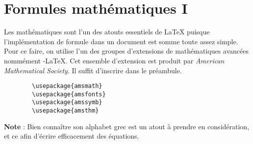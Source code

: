 	\section*{Formules mathématiques I}
	Les mathématiques sont l'un des atouts essentiels de \LaTeX{} puisque l'implémentation de formule dans un document est somme toute assez simple. Pour ce faire, on utilise l'un des groupes d'extensions de mathématiques avancées nommément \AmS-\LaTeX. Cet ensemble d'extension est produit par \emph{American Mathematical Society}. Il suffit d'inscrire dans le préambule.
%
	\begin{verbatim}
		\usepackage{amsmath}
		\usepackage{amsfonts}
		\usepackage{amssymb}
		\usepackage{amsthm}
	\end{verbatim}
%
	\textbf{Note} : Bien connaître son alphabet grec est un atout à prendre en considération, et ce afin d'écrire efficacement des équations.%
%	
